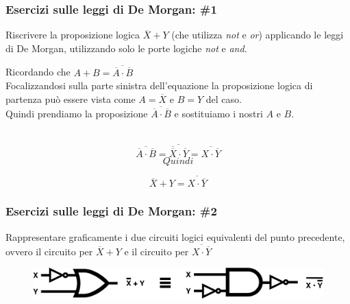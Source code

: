 \begin{frame}
	\frametitle{Esercizi sulle leggi di De Morgan: \#1}

	\begin{block}{Riscrivere la proposizione logica $\overline{X} + Y$ (che utilizza \textit{not} e \textit{or}) applicando le leggi di De Morgan, utilizzando solo le porte logiche \textit{not} e \textit{and}.}
		
		Ricordando che $A + B = \overline{\overline {A} \cdot \overline {B}}$\\
		\pause
		Focalizzandosi sulla parte sinistra dell'equazione la proposizione logica di partenza può essere vista come $A = \overline {X}$ e $B = Y$ del caso.\\
		\pause
		Quindi prendiamo la proposizione $\overline{\overline {A} \cdot \overline {B}}$ e sostituiamo i nostri $A$ e $B$.\\~\\
		\pause
		
		$$\overline{\overline {A} \cdot \overline {B}} = \overline{\overline {\overline {X}} \cdot \overline {Y}} = \overline{X \cdot \overline {Y}}$$
		\pause
		$$Quindi$$
		
		$$\overline{X} + Y = \overline{X \cdot \overline {Y}}$$ 
		
		
			
	\end{block}
	
\end{frame}


\begin{frame}
	\frametitle{Esercizi sulle leggi di De Morgan: \#2}

	\begin{block}{Rappresentare graficamente i due circuiti logici equivalenti del punto precedente, ovvero il circuito per $\overline{X} + Y$ e il circuito per $\overline{X \cdot \overline {Y}}$}
		\vspace{1em}
		\pause
		\begin{figure}[!htbp]
			\centering 
			\includegraphics[width=0.8\linewidth]{images/2_le_architetture/demorgan_ex.pdf}
		\end{figure}
			
	\end{block}
	
\end{frame}



